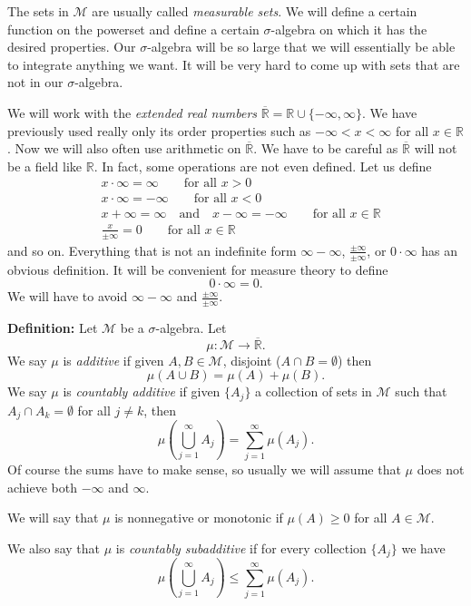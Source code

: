 \documentclass[12pt]{book}
\newcommand{\R}{{\mathbb{R}}}
\newcommand{\sM}{{\mathcal{M}}}
\theoremstyle{plain}
\theoremstyle{remark}
\theoremstyle{definition}
\theoremstyle{exercise}
\theoremstyle{example}
\begin{document}
The sets in $\sM$ are usually called \emph{measurable sets}.  We will define a
certain function on the powerset and define a certain
$\sigma$-algebra on which it has the desired properties.  Our
$\sigma$-algebra will be so large that we will essentially be able to
integrate anything we want.  It will be very hard to come up with sets that
are not in our $\sigma$-algebra.

\medskip

We will work with the \emph{extended real numbers}
$\overline{\R} = \R \cup \{ -\infty, \infty \}$.  We have previously used
really only its order properties such as $-\infty < x < \infty$ for
all $x \in \R$.  Now we will also often use arithmetic on 
$\overline{\R}$.  We have to be careful as
$\overline{\R}$ will not be a field like $\R$.  In fact, some operations are
not even defined.  Let us define
\begin{align*}
& x \cdot \infty = \infty \qquad \text{for all $x > 0$} \\
& x \cdot \infty = -\infty \qquad \text{for all $x < 0$} \\
& x + \infty = \infty \quad \text{and} \quad x - \infty = -\infty \qquad
\text{for all $x \in \R$} \\
&
\frac{x}{\pm\infty} = 0
\qquad \text{for all $x \in \R$}
\end{align*}
and so on.  Everything that is not an indefinite form
$\infty - \infty$, $\frac{\pm \infty}{\pm \infty}$, or $0 \cdot \infty$
has an obvious definition.  It will be convenient for measure theory to define
$$
0 \cdot \infty = 0 .
$$
We will have to avoid $\infty - \infty$ and
$\frac{\pm \infty}{\pm \infty}$.

\medskip

\textbf{Definition:}
Let $\sM$ be a $\sigma$-algebra.  Let
$$
\mu \colon \sM \to \overline{\R} .
$$
We say $\mu$ is \emph{additive} if given $A, B \in \sM$,
disjoint ($A \cap B = \emptyset$) then
$$
\mu ( A \cup B) = \mu (A) + \mu(B) .
$$
We say $\mu$ is \emph{countably additive} if given $\{ A_j \}$ a collection
of sets in $\sM$ such that $A_j \cap A_k = \emptyset$ for all $j\not=k$, then
$$
\mu \left( \bigcup_{j=1}^\infty A_j \right) =
\sum_{j=1}^\infty \mu (A_j) .
$$
Of course the sums have to make sense, so usually we will assume that $\mu$
does not achieve both $-\infty$ and $\infty$.

We will say that $\mu$ is nonnegative or monotonic if $\mu(A) \geq 0$ for all $A \in \sM$.

We also say that
$\mu$ is \emph{countably subadditive} if for every collection
$\{ A_j \}$ we have
$$
\mu \left( \bigcup_{j=1}^\infty A_j \right) \leq
\sum_{j=1}^\infty \mu (A_j) .
$$
\end{document}
